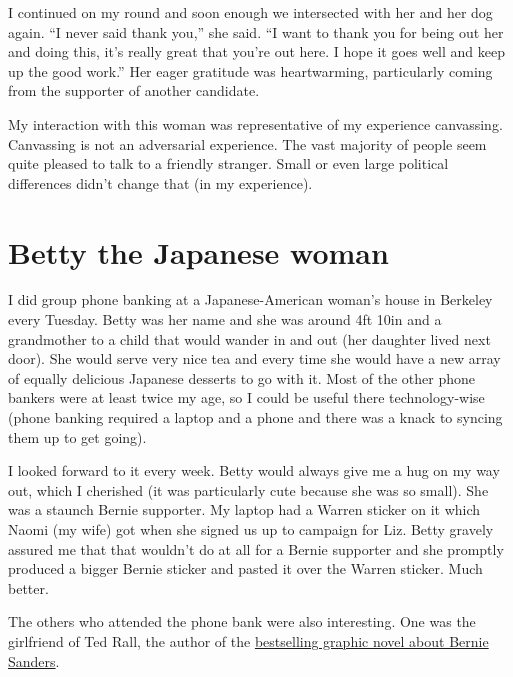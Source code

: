 \documentclass[]{book}
\begin{document}
I continued on my round and soon enough we intersected with her and her dog again. ``I never said thank you,'' she said. ``I want to thank you for being out her and doing this, it's really great that you're out here. I hope it goes well and keep up the good work.'' Her eager gratitude was heartwarming, particularly coming from the supporter of another candidate.

My interaction with this woman was representative of my experience canvassing. Canvassing is not an adversarial experience. The vast majority of people seem quite pleased to talk to a friendly stranger. Small or even large political differences didn't change that (in my experience).

\hypertarget{betty-the-japanese-woman}{%
\section{Betty the Japanese woman}\label{betty-the-japanese-woman}}

I did group phone banking at a Japanese-American woman's house in Berkeley every Tuesday. Betty was her name and she was around 4ft 10in and a grandmother to a child that would wander in and out (her daughter lived next door). She would serve very nice tea and every time she would have a new array of equally delicious Japanese desserts to go with it. Most of the other phone bankers were at least twice my age, so I could be useful there technology-wise (phone banking required a laptop and a phone and there was a knack to syncing them up to get going).

I looked forward to it every week. Betty would always give me a hug on my way out, which I cherished (it was particularly cute because she was so small). She was a staunch Bernie supporter. My laptop had a Warren sticker on it which Naomi (my wife) got when she signed us up to campaign for Liz. Betty gravely assured me that that wouldn't do at all for a Bernie supporter and she promptly produced a bigger Bernie sticker and pasted it over the Warren sticker. Much better.

The others who attended the phone bank were also interesting. One was the girlfriend of Ted Rall, the author of the \href{https://www.penguinrandomhouse.com/books/536904/bernie-by-ted-rall/}{bestselling graphic novel about Bernie Sanders}.


\end{document}
